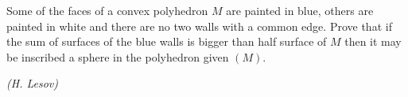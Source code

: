 Some of the faces of a convex polyhedron $M$ are painted in blue, others are painted in white and there are no two walls with a common edge. Prove that if the sum of surfaces of the blue walls is bigger than half surface of $M$ then it may be inscribed a sphere in the polyhedron given $(M)$.

\textit{(H. Lesov)}